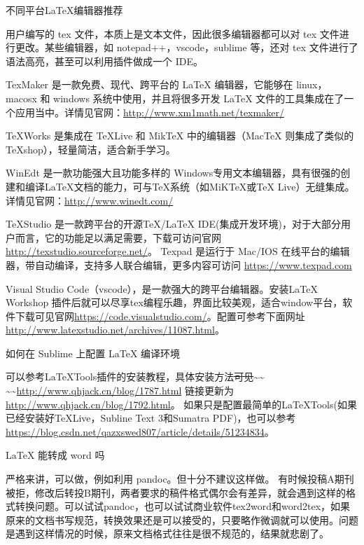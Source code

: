 \begin{faq}{不同平台LaTeX编辑器推荐}

用户编写的 tex 文件，本质上是文本文件，因此很多编辑器都可以对 tex
文件进行更改。某些编辑器，如 notepad++，vscode，sublime 等，还对 tex
文件进行了语法高亮，甚至可以利用插件做成一个 IDE。

TexMaker 是一款免费、现代、跨平台的 LaTeX 编辑器，它能够在 linux，macosx 和
windows 系统中使用，并且将很多开发 LaTeX
文件的工具集成在了一个应用当中。详情见官网：\url{http://www.xm1math.net/texmaker/}

TeXWorks 是集成在 TeXLive 和 MikTeX 中的编辑器（MacTeX 则集成了类似的
TeXshop），轻量简洁，适合新手学习。

WinEdt 是一款功能强大且功能多样的
Windows专用文本编辑器，具有很强的创建和编译LaTeX文档的能力，可与TeX系统（如MiKTeX或TeX Live）无缝集成。详情见官网：\url{http://www.winedt.com/}

TeXStudio 是一款跨平台的开源TeX/LaTeX
IDE(集成开发环境)，对于大部分用户而言，它的功能足以满足需要，下载可访问官网
\url{http://texstudio.sourceforge.net/}。 Texpad 是运行于 Mac/IOS
在线平台的编辑器，带自动编译，支持多人联合编辑，更多内容可访问
\url{https://www.texpad.com}

Visual Studio Code（vscode），是一款强大的跨平台编辑器。安装LaTeX Workshop
插件后就可以尽享tex编程乐趣，界面比较美观，适合window平台，软件下载可见官网\url{https://code.visualstudio.com/}。配置可参考下面网址\url{http://www.latexstudio.net/archives/11087.html}。
\end{faq}


\begin{faq}{如何在 Sublime 上配置 LaTeX 编译环境}

可以参考LaTeXTools插件的安装教程，具体安装方法\sout{可见}\textasciitilde{}\textasciitilde{}
\textasciitilde{}\textasciitilde{}\url{http://www.qhjack.cn/blog/1787.html}
链接更新为\url{http://www.qhjack.cn/blog/1792.html}。
如果只是配置最简单的LaTeXTools(如果已经安装好TeXLive，Subline Text
3和Sumatra
PDF)，也可以参考\url{https://blog.csdn.net/qazxswed807/article/details/51234834}。
\end{faq}


\begin{faq}{LaTeX 能转成 word 吗}

严格来讲，可以做，例如利用 pandoc。但十分不建议这样做。
有时候投稿A期刊被拒，修改后转投B期刊，两者要求的稿件格式偶尔会有差异，就会遇到这样的格式转换问题。可以试试pandoc，也可以试试商业软件tex2word和word2tex，如果原来的文档书写规范，转换效果还是可以接受的，只要略作微调就可以使用。问题是遇到这样情况的时候，原来文档格式往往是很不规范的，结果就悲剧了。
\end{faq}


